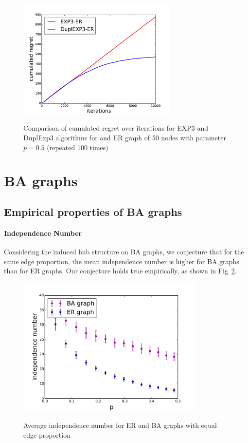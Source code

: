 \documentclass[10pt,a4paper]{scrartcl}
\begin{document}
\begin{figure}[H]
\centering
\includegraphics[height=6cm]{figures/50new_dupl_big_r05.pdf}
\label{duplexp3vsexp3ER}
\caption{Comparison of cumulated regret over iterations for EXP3 and DuplExp3 algorithms for and ER graph of 50 nodes with parameter $p=0.5$ (repeated 100 times)}
\end{figure}

\section{BA graphs}
\subsection{Empirical properties of BA graphs}
\paragraph{Independence Number}
Considering the induced hub structure on BA graphs, we conjecture that for the same edge proportion, the mean independence number is higher for BA graphs than for ER graphs. Our conjecture holds true empirically, as shown in Fig~\ref{mean_alpha_ba_er}.

\begin{figure}[H]
\centering
 \includegraphics[height=7cm]{figures/independance_number_com.pdf}
 \label{mean_alpha_ba_er}
 \caption{Average independence number for ER and BA graphs with equal edge proportion}
\end{figure}
\end{document}
